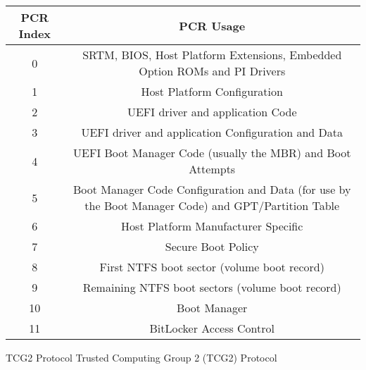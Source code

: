 \begin{tabular}{ |c||c|  }
    \hline
    \acs{PCR} Index & \acs{PCR} Usage                                                                                          \\
    \hline
    \hline
    0               & SRTM, BIOS, Host Platform Extensions, Embedded Option ROMs and PI Drivers                                \\
    \hline
    1               & Host Platform Configuration                                                                              \\
    \hline
    2               & UEFI driver and application Code                                                                         \\
    \hline
    3               & UEFI driver and application Configuration and Data                                                       \\
    \hline
    4               & UEFI Boot Manager Code (usually the MBR) and Boot Attempts                                               \\
    \hline
    5               & Boot Manager Code Configuration and Data (for use by the Boot Manager Code) and \ac{GPT}/Partition Table \\
    \hline
    6               & Host Platform Manufacturer Specific                                                                      \\
    \hline
    7               & Secure Boot Policy                                                                                       \\
    \hline
    8               & First \ac{NTFS} boot sector (volume boot record)                                                         \\
    \hline
    9               & Remaining \ac{NTFS} boot sectors (volume boot record)                                                    \\
    \hline
    10              & Boot Manager                                                                                             \\
    \hline
    11              & BitLocker Access Control                                                                                 \\
    \hline
\end{tabular}
\cite{tcg-pc-client-platform-firmware-profile-spec, windows-internals-6-part2}




\cite{tianocore-trusted-boot-chain}

\ac{TCG}2 Protocol
Trusted Computing Group 2 (TCG2) Protocol \cite[6.7.3]{tcg-efi-protocol-spec}

